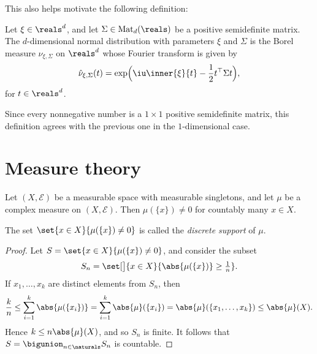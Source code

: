 \documentclass[article, a4paper, 11pt, oneside]{memoir}
\numberwithin{equation}{chapter}
\newcommand{\calE}{\mathcal{E}}
\begin{document}

This also helps motivate the following definition:

\begin{definition}
    Let $\xi \in \reals^d$, and let $\Sigma \in \mathrm{Mat}_d(\reals)$ be a positive semidefinite matrix. The $d$-dimensional normal distribution with parameters $\xi$ and $\Sigma$ is the Borel measure $\nu_{\xi,\Sigma}$ on $\reals^d$ whose Fourier transform is given by
    \begin{equation*}
        \hat{\nu}_{\xi,\Sigma}(t)
            = \exp \Bigl( \iu \inner{\xi}{t} - \frac{1}{2} t\trans \Sigma t \Bigr),
    \end{equation*}
    for $t \in \reals^d$.
\end{definition}
%
Since every nonnegative number is a $1 \times 1$ positive semidefinite matrix, this definition agrees with the previous one in the $1$-dimensional case.


\chapter{Measure theory}


\begin{lemma}
    Let $(X,\calE)$ be a measurable space with measurable singletons, and let $\mu$ be a complex measure on $(X,\calE)$. Then $\mu(\{x\}) \neq 0$ for countably many $x \in X$.
\end{lemma}
%
The set $\set{x \in X}{\mu(\{x\}) \neq 0}$ is called the \emph{discrete support} of $\mu$.

\begin{proof}
    Let $S = \set{x \in X}{\mu(\{x\}) \neq 0}$, and consider the subset
    \begin{equation*}
        S_n
            = \set[\big]{x \in X}{\abs{\mu(\{x\})} \geq \tfrac{1}{n}}.
    \end{equation*}
    If $x_1, \ldots, x_k$ are distinct elements from $S_n$, then
    \begin{equation*}
        \frac{k}{n}
            \leq \sum_{i=1}^k \abs{\mu(\{x_i\})}
            = \sum_{i=1}^k \abs{\mu}(\{x_i\})
            = \abs{\mu}(\{x_1, \ldots, x_k\})
            \leq \abs{\mu}(X).
    \end{equation*}
    Hence $k \leq n \abs{\mu}(X)$, and so $S_n$ is finite. It follows that $S = \bigunion_{n \in \naturals} S_n$ is countable.
\end{proof}
\end{document}
